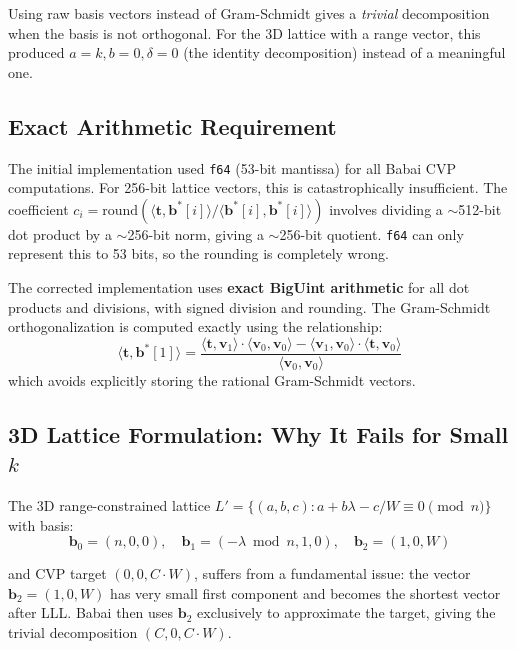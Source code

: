 \documentclass[11pt,a4paper]{article}
\theoremstyle{definition}
\begin{document}
Using raw basis vectors instead of Gram-Schmidt gives a \emph{trivial} decomposition when the basis is not orthogonal. For the 3D lattice with a range vector, this produced $a = k, b = 0, \delta = 0$ (the identity decomposition) instead of a meaningful one.

\subsection{Exact Arithmetic Requirement}

\begin{tcolorbox}[colback=orange!5, colframe=orange!70!black, title={\textbf{BUG FIX: f64 Precision Loss}}]
The initial implementation used \texttt{f64} (53-bit mantissa) for all Babai CVP computations. For 256-bit lattice vectors, this is catastrophically insufficient. The coefficient $c_i = \text{round}(\langle \mathbf{t}, \mathbf{b}^*[i] \rangle / \langle \mathbf{b}^*[i], \mathbf{b}^*[i] \rangle)$ involves dividing a $\sim$512-bit dot product by a $\sim$256-bit norm, giving a $\sim$256-bit quotient. \texttt{f64} can only represent this to 53 bits, so the rounding is completely wrong.

The corrected implementation uses \textbf{exact BigUint arithmetic} for all dot products and divisions, with signed division and rounding. The Gram-Schmidt orthogonalization is computed exactly using the relationship:
$$\langle \mathbf{t}, \mathbf{b}^*[1] \rangle = \frac{\langle \mathbf{t}, \mathbf{v}_1 \rangle \cdot \langle \mathbf{v}_0, \mathbf{v}_0 \rangle - \langle \mathbf{v}_1, \mathbf{v}_0 \rangle \cdot \langle \mathbf{t}, \mathbf{v}_0 \rangle}{\langle \mathbf{v}_0, \mathbf{v}_0 \rangle}$$
which avoids explicitly storing the rational Gram-Schmidt vectors.
\end{tcolorbox}

\subsection{3D Lattice Formulation: Why It Fails for Small $k$}

The 3D range-constrained lattice $L' = \{(a, b, c) : a + b\lambda - c/W \equiv 0 \pmod{n}\}$ with basis:
$$\mathbf{b}_0 = (n, 0, 0), \quad \mathbf{b}_1 = (-\lambda \bmod n, 1, 0), \quad \mathbf{b}_2 = (1, 0, W)$$

and CVP target $(0, 0, C \cdot W)$, suffers from a fundamental issue: the vector $\mathbf{b}_2 = (1, 0, W)$ has very small first component and becomes the shortest vector after LLL. Babai then uses $\mathbf{b}_2$ exclusively to approximate the target, giving the trivial decomposition $(C, 0, C \cdot W)$.
\end{document}
